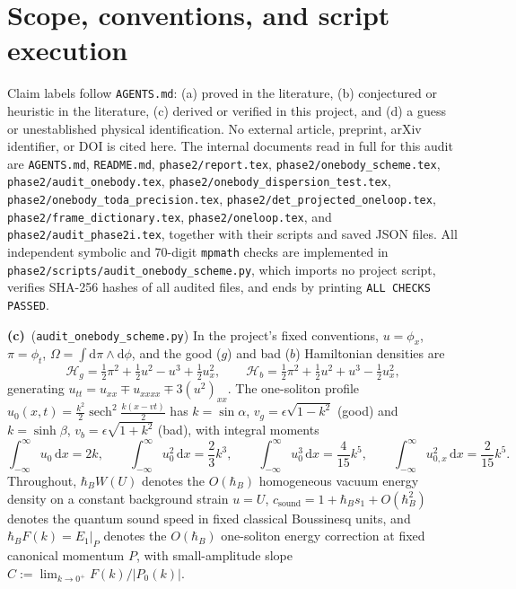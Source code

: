 \documentclass[11pt,a4paper]{article}
\newcommand{\Lc}{\textbf{(c)}\ }
\newcommand{\dd}{\mathrm d}
\newcommand{\scr}{\texttt{audit\_\allowbreak onebody\_\allowbreak scheme.py}}
\begin{document}
\section{Scope, conventions, and script execution}
Claim labels follow \texttt{AGENTS.md}: (a) proved in the literature,
(b) conjectured or heuristic in the literature, (c) derived or verified in this
project, and (d) a guess or unestablished physical identification.
No external article, preprint, arXiv identifier, or DOI is cited here.
The internal documents read in full for this audit are \texttt{AGENTS.md},
\texttt{README.md}, \texttt{phase2/\allowbreak report.tex},
\texttt{phase2/\allowbreak onebody\_\allowbreak scheme.tex},
\texttt{phase2/\allowbreak audit\_\allowbreak onebody.tex},
\texttt{phase2/\allowbreak onebody\_\allowbreak dispersion\_\allowbreak test.tex},
\texttt{phase2/\allowbreak onebody\_\allowbreak toda\_\allowbreak precision.tex},
\texttt{phase2/\allowbreak det\_\allowbreak projected\_\allowbreak oneloop.tex},
\texttt{phase2/\allowbreak frame\_\allowbreak dictionary.tex},
\texttt{phase2/\allowbreak oneloop.tex}, and
\texttt{phase2/\allowbreak audit\_\allowbreak phase2i.tex}, together with their scripts and saved JSON files.
All independent symbolic and 70-digit \texttt{mpmath} checks are implemented in
\texttt{phase2/\allowbreak scripts/}\scr, which imports no project script, verifies SHA-256
hashes of all audited files, and ends by printing \texttt{ALL CHECKS PASSED}.

\Lc (\scr) In the project's fixed conventions, $u = \phi_x$, $\pi = \phi_t$,
$\Omega = \int\dd\pi\wedge\dd\phi$, and the good ($g$) and bad ($b$) Hamiltonian
densities are
\begin{equation}
  \mathcal{H}_g = \tfrac{1}{2}\pi^2 + \tfrac{1}{2}u^2 - u^3 + \tfrac{1}{2}u_x^2,
  \qquad
  \mathcal{H}_b = \tfrac{1}{2}\pi^2 + \tfrac{1}{2}u^2 + u^3 - \tfrac{1}{2}u_x^2,
  \label{eq:Hg-Hb}
\end{equation}
generating $u_{tt} = u_{xx} \mp u_{xxxx} \mp 3(u^2)_{xx}$.
The one-soliton profile $u_0(x,t) = \frac{k^2}{2}\operatorname{sech}^2\frac{k(x-vt)}{2}$
has $k = \sin\alpha$, $v_g = \epsilon\sqrt{1-k^2}$ (good) and $k = \sinh\beta$,
$v_b = \epsilon\sqrt{1+k^2}$ (bad), with integral moments
\begin{equation}
  \int_{-\infty}^{\infty} u_0\,\dd x = 2k, \qquad
  \int_{-\infty}^{\infty} u_0^2\,\dd x = \frac{2}{3}k^3, \qquad
  \int_{-\infty}^{\infty} u_0^3\,\dd x = \frac{4}{15}k^5, \qquad
  \int_{-\infty}^{\infty} u_{0,x}^2\,\dd x = \frac{2}{15}k^5.
  \label{eq:moments}
\end{equation}
Throughout, $\hbar_B W(U)$ denotes the $O(\hbar_B)$ homogeneous vacuum energy
density on a constant background strain $u = U$, $c_{\mathrm{sound}} = 1 + \hbar_B s_1 + O(\hbar_B^2)$
denotes the quantum sound speed in fixed classical Boussinesq units, and
$\hbar_B F(k) = E_1\big|_P$ denotes the $O(\hbar_B)$ one-soliton energy correction
at fixed canonical momentum $P$, with small-amplitude slope
$C := \lim_{k\to 0^+} F(k)/|P_0(k)|$.
\end{document}
